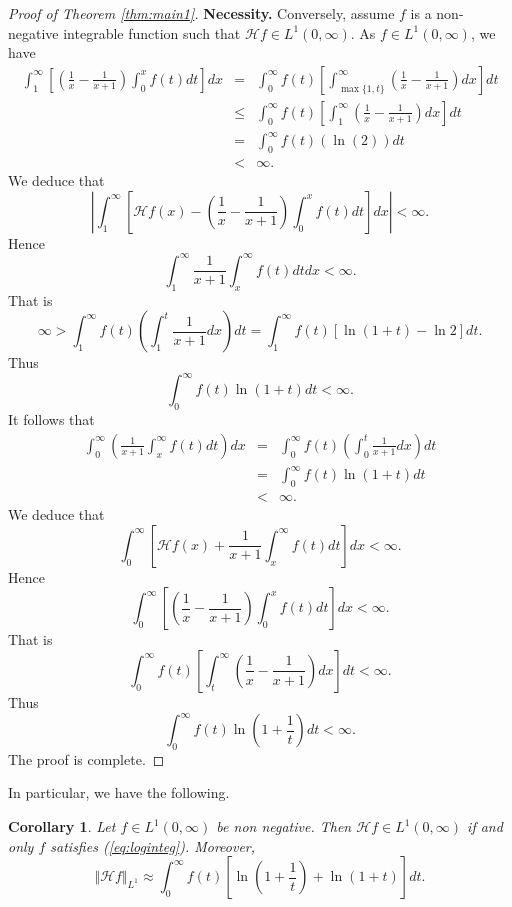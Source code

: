 \documentclass[12pt,a4paper]{amsart}
\newtheorem{corollary}[theorem]{Corollary}
\theoremstyle{definition}
\newcommand{\Lp}[1]{L^{#1}(0,\infty)}
\begin{document}
\begin{proof}[Proof of Theorem \ref{thm:main1}]
\medskip
\textbf{Necessity.}
Conversely, assume $f$ is a non-negative integrable function such that $\mathcal{H}f\in\Lp{1}$. As $f\in\Lp{1}$, we have
\begin{eqnarray*}
\int_1^\infty\left[\left(\frac{1}{x}-\frac{1}{x+1}\right)\int_0^x f(t)dt\right]dx &=&  \int_0^\infty f(t)\left[\int_{\max\{1,t\}}^\infty\left(\frac{1}{x}-\frac{1}{x+1}\right)dx\right]dt\\ &\leq&  \int_0^\infty f(t)\left[\int_1^\infty\left(\frac{1}{x}-\frac{1}{x+1}\right)dx\right]dt\\ &=& \int_0^\infty f(t)\left(\ln(2)\right)dt\\ &<& \infty.
\end{eqnarray*}
We deduce that
$$\left\vert\int_1^\infty\left[\mathcal{H}f(x)-\left(\frac{1}{x}-\frac{1}{x+1}\right)\int_0^x f(t)dt\right]dx\right\vert<\infty.$$
Hence
$$\int_1^\infty\frac{1}{x+1}\int_x^\infty f(t)dtdx<\infty.$$
That is $$\infty>\int_1^\infty f(t)\left(\int_1^t\frac{1}{x+1}dx\right)dt=\int_1^\infty f(t)\left[\ln(1+t)-\ln2\right]dt.$$
Thus $$\int_0^\infty f(t)\ln(1+t)dt<\infty.$$
It follows that
\begin{eqnarray*}\int_0^\infty\left(\frac{1}{x+1}\int_x^\infty f(t)dt\right)dx &=& \int_0^\infty f(t)\left(\int_0^t\frac{1}{x+1}dx\right)dt\\ &=&\int_0^\infty f(t)\ln(1+t)dt\\ &<&\infty.
\end{eqnarray*}
We deduce that
$$\int_0^\infty \left[\mathcal{H}f(x)+\frac{1}{x+1}\int_x^\infty f(t)dt\right]dx<\infty.$$
Hence $$\int_0^\infty\left[\left(\frac{1}{x}-\frac{1}{x+1}\right)\int_0^x f(t)dt\right]dx<\infty.$$
That is
$$\int_0^\infty f(t)\left[\int_t^\infty\left(\frac{1}{x}-\frac{1}{x+1}\right)dx\right]dt<\infty.$$
Thus $$\int_0^\infty f(t)\ln\left(1+\frac{1}{t}\right)dt<\infty.$$
The proof is complete.
\end{proof}
In particular, we have the following.
\begin{corollary}\label{cor:main1}
Let $f\in \Lp{1}$ be non negative. Then $\mathcal{H}f\in \Lp{1}$ if and only  $f$ satisfies (\ref{eq:loginteg}). Moreover, 
\begin{equation}\label{eq:equivnorm}
\Vert \mathcal{H}f\Vert_{L^1}\approx\int_0^\infty f(t)\left[\ln\left(1+\frac{1}{t}\right)+\ln\left(1+t\right)\right]dt.
\end{equation}
\end{corollary}
\end{document}
